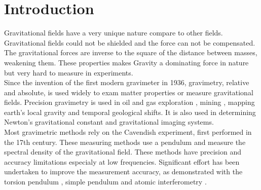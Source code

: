 \documentclass[\main/master.tex]{subfiles}
\begin{document}
\chapter{Introduction}\label{chp:example-1}


Gravitational fields have a very unique nature compare to other fields. Gravitational fields could not be shielded and the force can not be compensated. The gravitational forces are inverse to the square of the distance between masses, weakening them. These properties makes Gravity a dominating force in nature but very hard to measure in experiments.
\\
Since the invention of the first modern gravimeter in 1936, gravimetry, relative and absolute, is used widely to exam matter properties or measure gravitational fields. Precision gravimetry \cite{Wahr04,Bingham10,Bell98,Leeuwen00,Diorio03,Romaides01,Peters01,Luther82,Kuroda95,Karagioz96,Bagley97,Gundlach00,Quinn01,Armstrong03,Kleinevoss99,Parks10,Peters99,Mcguirk02,Dimopoulos07,Lamporesi08,Sorrentino10,Rosi14,Goodkind99} is used in oil and gas exploration \cite{Bell98}, mining \cite{Leeuwen00}, mapping earth's local gravity \cite{Wahr04,Bingham10} and temporal geological shifts. It is also used in determining Newton's gravitational constant \cite{Luther82, Kuroda95, Karagioz96, Bagley97, Gundlach00, Quinn01, Armstrong03, Kleinevoss99, Parks10, Peters99, Mcguirk02, Dimopoulos07, Lamporesi08, Sorrentino10, Rosi14} and gravitational imaging systems. 
\\
Most gravimetric methods rely on the Cavendish experiment, first performed in the 17th century. These measuring methods use a pendulum and measure the spectral density of the gravitational field. These methods have precision and accuracy limitations especialy at low frequencies. Significant effort has been undertaken to improve the measurement accuracy, as demonstrated with the torsion pendulum \cite{Luther82,Kuroda95,Karagioz96,Bagley97,Gundlach00,Quinn01,Armstrong03}, simple pendulum \cite {Kleinevoss99,Parks10} and atomic interferometry \cite{Lamporesi08,Sorrentino10,Rosi14}.
\iffalse
\end{document}
